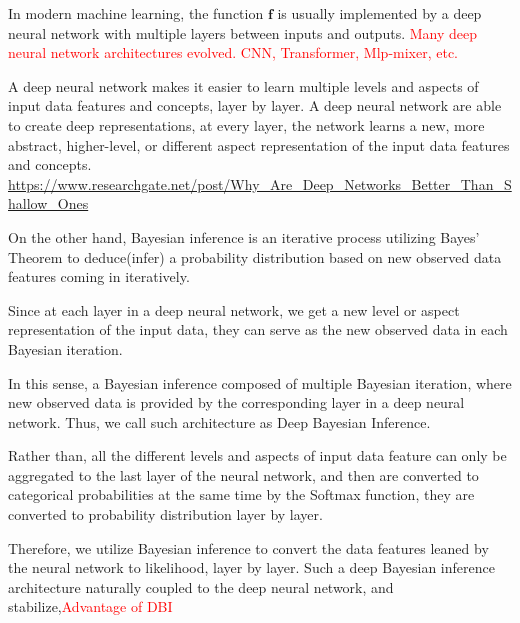 \documentclass{article}
\begin{document}
In modern machine learning, the function $\bm{f}$ is usually implemented by a deep neural network with multiple layers between inputs and outputs.
\textcolor{red}{Many deep neural network architectures evolved. CNN, Transformer, Mlp-mixer, etc.}


A deep neural network makes it easier to learn multiple levels and aspects of input data features and concepts, layer by layer.
A deep neural network are able to create deep representations, at every layer, the network learns a new, more abstract, higher-level, or different aspect representation of the input data features and concepts.
\url{https://www.researchgate.net/post/Why_Are_Deep_Networks_Better_Than_Shallow_Ones}

On the other hand, Bayesian inference is an iterative process utilizing Bayes' Theorem to deduce(infer) a probability distribution based on new observed data features coming in iteratively.

Since at each layer in a deep neural network, we get a new level or aspect representation of the input data,
they can serve as the new observed data in each Bayesian iteration.

In this sense, a Bayesian inference composed of multiple Bayesian iteration, where new observed data is provided by the corresponding layer in a deep neural network.
Thus, we call such architecture as Deep Bayesian Inference.

Rather than, all the different levels and aspects of input data feature can only be aggregated to the last layer of the neural network, and then are converted to categorical probabilities at the same time by the Softmax function,
they are converted to probability distribution layer by layer.

Therefore, we utilize Bayesian inference to convert the data features leaned by the neural network to likelihood, layer by layer.
Such a deep Bayesian inference architecture naturally coupled to the deep neural network, and stabilize,\textcolor{red}{Advantage of DBI}
\end{document}
